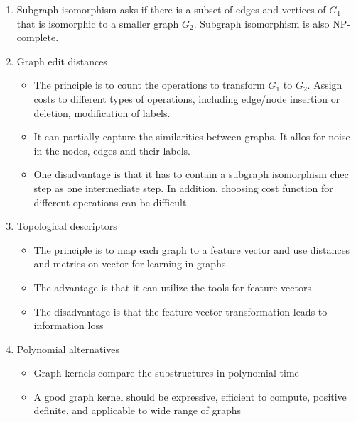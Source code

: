 \documentclass[14pt]{article}
\begin{document}
\begin{enumerate}
 \item Subgraph isomorphism asks if there is a subset of edges and vertices of $G_1$ that is isomorphic to a smaller graph $G_2$. Subgraph isomorphism is also NP-complete.
 
 \item Graph edit distances
  \begin{itemize}
   \item The principle is to count the operations to transform $G_1$ to $G_2$. Assign costs to different types of operations, including edge/node insertion or deletion, modification of labels. 
   \item It can partially capture the similarities between graphs. It allos for noise in the nodes, edges and their labels. 
   \item One disadvantage is that it has to contain a subgraph isomorphism chec step as one intermediate step. In addition, choosing cost function for different operations can be difficult.
  \end{itemize}
  
 \item Topological descriptors
  \begin{itemize}
   \item The principle is to map each graph to a feature vector and use distances and metrics on vector for learning in graphs.
   \item The advantage is that it can utilize the tools for feature vectors
   \item The disadvantage is that the feature vector transformation leads to information loss
  \end{itemize}
 
 \item Polynomial alternatives
  \begin{itemize}
   \item Graph kernels compare the substructures in polynomial time
   \item A good graph kernel should be expressive, efficient to compute, positive definite, and applicable to wide range of graphs 
  \end{itemize}
 
\end{enumerate}
\end{document}
